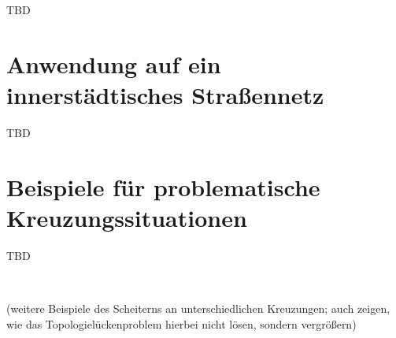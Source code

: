 \documentclass[../main/thesis.tex]{subfiles}
\begin{document}
TBD



\chapter{Anwendung auf ein innerstädtisches Straßennetz}
\label{appx:fullpage-examples-2}

TBD



\setcounter{chapter}{5}
\chapter{Beispiele für problematische Kreuzungssituationen}
\label{appx:junction-examples}

TBD

~

\noindent
(weitere Beispiele des Scheiterns an unterschiedlichen Kreuzungen; auch zeigen, wie  das Topologielückenproblem hierbei nicht lösen, sondern vergrößern)





\end{document}
